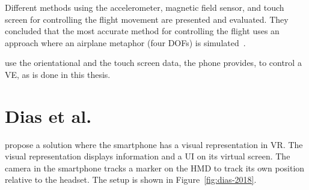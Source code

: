 Different methods using the accelerometer, magnetic field sensor, and touch screen for controlling the flight movement are presented and evaluated. They concluded that the most accurate method for controlling the flight uses an approach where an airplane metaphor (four \glspl{DOF}) is simulated~\cite{Benzina.2011}.

\citeauthor{Benzina.2011} use the orientational and the touch screen data, the phone provides, to control a \gls{VE}, as is done in this thesis.


\section{Dias et al.\@}\label{section:dias-2018}
\citeauthor{Dias.2018} propose a solution where the smartphone has a visual representation in \gls{VR}. The visual representation displays information and a \gls{UI} on its virtual screen. The camera in the smartphone tracks a marker on the \gls{HMD} to track its own position relative to the headset. The setup is shown in Figure~\ref{fig:dias-2018}.

